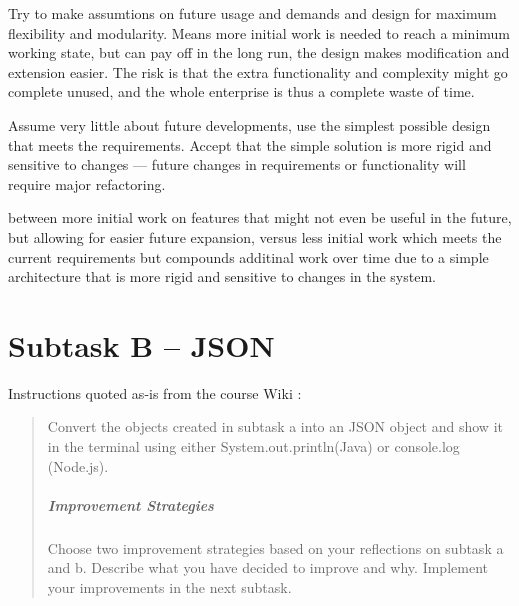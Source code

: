 \begin{enumerate*}
  \item Try to make assumtions on future usage and demands and design for
        maximum flexibility and modularity. Means more initial work is needed
        to reach a minimum working state, but can pay off in the long run,
        the design makes modification and extension easier.
        The risk is that the extra functionality and complexity might go
        complete unused, and the whole enterprise is thus a complete waste of time.
  \item Assume very little about future developments, use the simplest possible
        design that meets the requirements. Accept that the simple solution is
        more rigid and sensitive to changes --- future changes in requirements 
        or functionality will require major refactoring.
\end{enumerate*}


between more initial work on features that might not even
be useful in the future, but allowing for easier future expansion, versus less
initial work which meets the current requirements but compounds additinal work
over time due to a simple architecture that is more rigid and sensitive to
changes in the system.


\section{Subtask B -- JSON}\label{subtask-b-json}
Instructions quoted as-is from the course Wiki \cite{1dv600:lab1:instructions}:

\begin{quote}
  Convert the objects created in subtask a into an JSON object and show it in
  the terminal using either System.out.println(Java) or console.log (Node.js).
  
  \subparagraph{Improvement Strategies}
  
  Choose two improvement strategies based on your reflections on subtask a and
  b. Describe what you have decided to improve and why. Implement your 
  improvements in the next subtask.
\end{quote}

